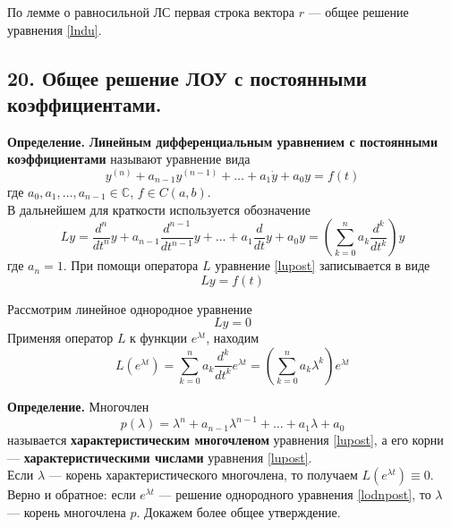 По лемме о равносильной ЛС первая строка вектора $r$ --- общее решение уравнения \eqref{lndu}.

\subsection*{20. Общее решение ЛОУ с постоянными коэффициентами.}

\textbf{Определение.} \textbf{Линейным дифференциальным уравнением с постоянными коэффициентами} называют уравнение вида
\begin{equation}
    y^{(n)} + a_{n - 1}y^{(n-1)} + \ldots + a_1\dot{y} + a_0y = f(t) \label{lupost}
\end{equation}
где $a_0, a_1, \ldots, a_{n-1} \in \mathbb{C}$, $f \in C(a,b)$.\\

В дальнейшем для краткости используется обозначение
\begin{equation*}
    Ly = \frac{d^n}{dt^n}y + a_{n-1}\frac{d^{n-1}}{dt^{n-1}}y + \ldots + a_1\frac{d}{dt}y + a_0y = \left(\sum_{k = 0}^n a_k\frac{d^k}{dt^k} \right)y
\end{equation*}
где $a_n = 1$. При помощи оператора $L$ уравнение \eqref{lupost} записывается в виде
\begin{equation*}
    Ly = f(t)
\end{equation*}

Рассмотрим линейное однородное уравнение
\begin{equation}
    Ly = 0 \label{lodnpost}
\end{equation}
Применяя оператор $L$ к функции $e^{\lambda t}$, находим
\begin{equation*}
    L(e^{\lambda t}) = \sum_{k = 0}^n a_k\frac{d^k}{dt^k}e^{\lambda t} = \left(\sum_{k = 0}^n a_k\lambda^k \right)e^{\lambda t}
\end{equation*}

\noindent \textbf{Определение.} Многочлен
\begin{equation*}
    p(\lambda) = \lambda^n + a_{n-1}\lambda^{n-1} + \ldots + a_1\lambda + a_0
\end{equation*}
называется \textbf{характеристическим многочленом} уравнения \eqref{lupost}, а его корни --- \textbf{характеристическими числами} уравнения \eqref{lupost}.\\

Если $\lambda$ --- корень характеристического многочлена, то получаем $L(e^{\lambda t}) \equiv 0$. Верно и обратное: если $e^{\lambda t}$ --- решение однородного уравнения \eqref{lodnpost}, то $\lambda$ --- корень многочлена $p$. Докажем более общее утверждение.\\


